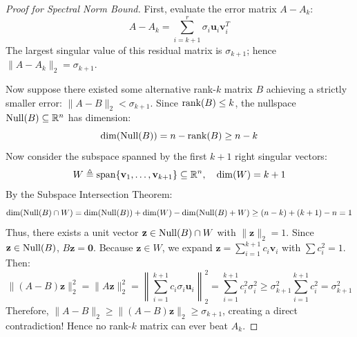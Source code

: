 \begin{proof}[Proof for Spectral Norm Bound]
First, evaluate the error matrix $A - A_k$:
\begin{equation}
A - A_k = \sum_{i=k+1}^r \sigma_i \mathbf{u}_i \mathbf{v}_i^T
\end{equation}
The largest singular value of this residual matrix is $\sigma_{k+1}$; hence $\|A - A_k\|_2 = \sigma_{k+1}$.

Now suppose there existed some alternative rank-$k$ matrix $B$ achieving a strictly smaller error: $\|A - B\|_2 < \sigma_{k+1}$.
Since $\operatorname{rank}(B) \le k$, the nullspace $\operatorname{Null}(B) \subseteq \mathbb{R}^n$ has dimension:
\begin{equation}
\dim(\operatorname{Null}(B)) = n - \operatorname{rank}(B) \ge n - k
\end{equation}
Now consider the subspace spanned by the first $k+1$ right singular vectors:
\begin{equation}
W \triangleq \operatorname{span}\{\mathbf{v}_1, \dots, \mathbf{v}_{k+1}\} \subseteq \mathbb{R}^n, \quad \dim(W) = k + 1
\end{equation}
By the Subspace Intersection Theorem:
\begin{equation}
\dim(\operatorname{Null}(B) \cap W) = \dim(\operatorname{Null}(B)) + \dim(W) - \dim(\operatorname{Null}(B) + W) \ge (n - k) + (k + 1) - n = 1
\end{equation}
Thus, there exists a unit vector $\mathbf{z} \in \operatorname{Null}(B) \cap W$ with $\|\mathbf{z}\|_2 = 1$. Since $\mathbf{z} \in \operatorname{Null}(B)$, $B\mathbf{z} = \mathbf{0}$.
Because $\mathbf{z} \in W$, we expand $\mathbf{z} = \sum_{i=1}^{k+1} c_i \mathbf{v}_i$ with $\sum c_i^2 = 1$. Then:
\begin{equation}
\|(A - B)\mathbf{z}\|_2^2 = \|A\mathbf{z}\|_2^2 = \left\| \sum_{i=1}^{k+1} c_i \sigma_i \mathbf{u}_i \right\|_2^2 = \sum_{i=1}^{k+1} c_i^2 \sigma_i^2 \ge \sigma_{k+1}^2 \sum_{i=1}^{k+1} c_i^2 = \sigma_{k+1}^2
\end{equation}
Therefore, $\|A - B\|_2 \ge \|(A - B)\mathbf{z}\|_2 \ge \sigma_{k+1}$, creating a direct contradiction!
Hence no rank-$k$ matrix can ever beat $A_k$.
\end{proof}


